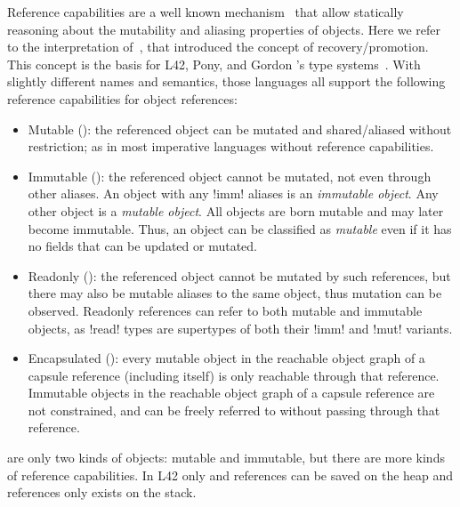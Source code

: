 Reference capabilities
 are a well known mechanism~\cite{TschantzErnst05,BirkaErnst04,OstlundEtAl08,clebsch2015deny,GianniniEtAl16,GordonEtAl12} that 
 allow statically reasoning about the mutability and aliasing properties of objects. Here we refer to the interpretation of~\cite{GordonEtAl12}, that introduced the concept of recovery/promotion. This concept is the basis for L42, Pony, and Gordon \etal's type systems~\cite{GordonEtAl12,ServettoEtAl13a,ServettoZucca15,clebsch2015deny,clebsch2017orca}. With slightly different names and semantics, those languages all support the following reference capabilities for object references: %
\begin{itemize}

\item Mutable (\Q@mut@): the referenced object can be mutated and shared/aliased without restriction; as in most imperative languages without reference capabilities.

\item Immutable (\Q@imm@): the referenced object cannot be mutated, not even through other aliases. An object with any \Q!imm! aliases is an \emph{immutable object}.
Any other object is a \emph{mutable object}.
All objects are born mutable and may later become immutable.
Thus, an object can be classified as \emph{mutable} even if it has no fields that can be updated or mutated.


\item Readonly (\Q@read@): the referenced object cannot be mutated by such references, but there may also be mutable aliases to the same object, thus mutation can be observed. Readonly references can refer to both mutable and immutable objects, as \Q!read! types are supertypes of both their \Q!imm! and \Q!mut! variants.
\item Encapsulated (\Q@capsule@):
every mutable object in the reachable object graph of a capsule reference (including itself) is only reachable through that reference. 
Immutable objects in the reachable object graph of a capsule reference are not constrained, and can be freely referred to without passing through that reference. 
\end{itemize}
\noindent {} are only two kinds of objects: mutable and immutable, but there are more kinds of reference capabilities.
In L42 only \Q@mut@ and \Q@imm@ references can be saved on the heap\IO[2.2]{:} \Q@capsule@ and \Q@read@ references only exists on the stack.

